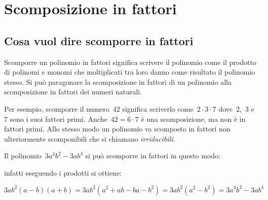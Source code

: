 
\section{Scomposizione in fattori}

\subsection{Cosa vuol dire scomporre in fattori}
\label{subsec:divpol_scomporre}

\begin{multicols}{2}
 
Scomporre un polinomio in fattori significa scrivere il polinomio come il 
prodotto di polinomi e monomi che
moltiplicati tra loro danno come risultato il polinomio stesso. 
Si può paragonare la scomposizione in fattori
di un polinomio alla scomposizione in fattori dei numeri naturali.

\begin{inaccessibleblock}
 \begin{center}
 
 \end{center}
\end{inaccessibleblock}

Per esempio, scomporre il numero~$42$ significa scriverlo 
come~$2\cdot 3 \cdot 7$ dove~$2$,~$3$ e~$7$ sono i suoi fattori primi.
Anche~$42 = 6 \cdot 7$ è una scomposizione, ma non è in fattori primi. 
Allo stesso modo un polinomio va scomposto in fattori non ulteriormente
scomponibili che si chiamano \emph{irriducibili}. 

Il polinomio~$3a^{3}b^{2}-3ab^{4}$ si può scomporre in fattori in questo modo: 

\begin{inaccessibleblock}
 \begin{center}
 
 \end{center}
\end{inaccessibleblock}

infatti eseguendo i prodotti si ottiene: 
\end{multicols}
\vspace{-12pt}
\[3ab^{2}(a-b)(a+b)=3ab^{2}(a^{2}+ab-ba-b^{2})=
  3ab^{2}\left(a^{2}-b^{2}\right)=3a^{3}b^{2}-3ab^{4}\]
  
